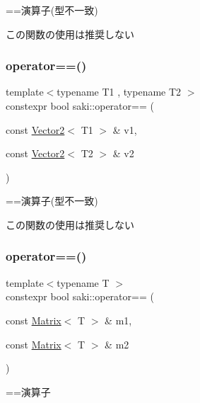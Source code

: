 ==演算子(型不一致) 

この関数の使用は推奨しない \mbox{\label{namespacesaki_a033d4b861140a6c00a8cb56ad71d463a}} 
\subsubsection{\texorpdfstring{operator==()}{operator==()}\hspace{0.1cm}{\footnotesize\ttfamily [8/10]}}
{\footnotesize\ttfamily template$<$typename T1 , typename T2 $>$ \\
constexpr bool saki\+::operator== (\begin{DoxyParamCaption}\item[{const \mbox{\hyperlink{classsaki_1_1_vector2}{Vector2}}$<$ T1 $>$ \&}]{v1,  }\item[{const \mbox{\hyperlink{classsaki_1_1_vector2}{Vector2}}$<$ T2 $>$ \&}]{v2 }\end{DoxyParamCaption})}



==演算子(型不一致) 

この関数の使用は推奨しない \mbox{\label{namespacesaki_acecebb6fed194d4ca5b6f123b5ed7563}} 
\subsubsection{\texorpdfstring{operator==()}{operator==()}\hspace{0.1cm}{\footnotesize\ttfamily [9/10]}}
{\footnotesize\ttfamily template$<$typename T $>$ \\
constexpr bool saki\+::operator== (\begin{DoxyParamCaption}\item[{const \mbox{\hyperlink{classsaki_1_1_matrix}{Matrix}}$<$ T $>$ \&}]{m1,  }\item[{const \mbox{\hyperlink{classsaki_1_1_matrix}{Matrix}}$<$ T $>$ \&}]{m2 }\end{DoxyParamCaption})}



==演算子 

\mbox{\label{namespacesaki_a57ebf9c4b637e0dff3c957a7b4786332}} 
